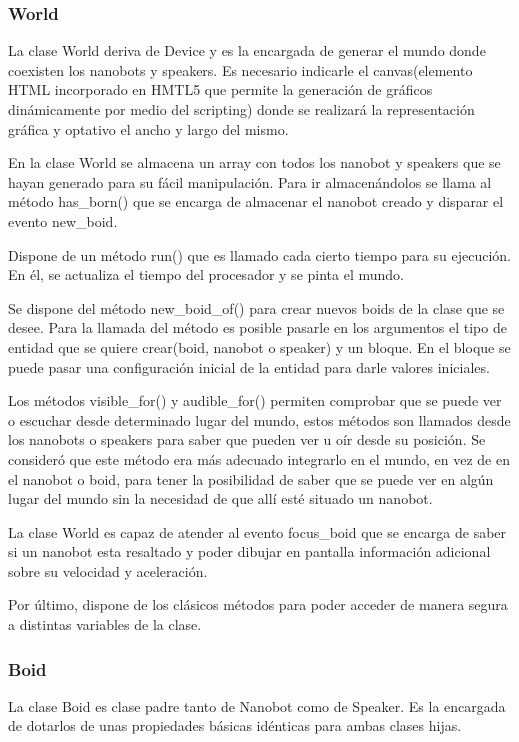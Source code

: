 \subsubsection{World}
\label{sec:world}
La clase World deriva de Device y es la encargada de generar el mundo donde coexisten los nanobots y speakers. Es necesario indicarle el canvas(elemento HTML incorporado en HMTL5 que permite la generación de gráficos dinámicamente por medio del scripting) donde se realizará la representación gráfica y optativo el ancho y largo del mismo. 

En la clase World se almacena un array con todos los nanobot y speakers que se hayan generado  para su fácil manipulación. Para ir almacenándolos se llama al método has\_born() que se encarga de almacenar el nanobot creado y disparar el evento new\_boid.

Dispone de un método run() que es llamado cada cierto tiempo para su ejecución. En él,  se actualiza el tiempo del procesador y se pinta el mundo.

Se dispone del método new\_boid\_of() para crear nuevos boids de la clase que se desee. Para la llamada del método es posible pasarle en los argumentos el tipo de entidad que se quiere crear(boid, nanobot o speaker) y un bloque. En el bloque se puede pasar una configuración inicial de la entidad para darle valores iniciales.

Los métodos visible\_for() y audible\_for() permiten comprobar que se puede ver o escuchar desde determinado lugar del mundo, estos métodos son llamados desde los nanobots o speakers para saber que pueden ver u oír desde su posición. Se consideró que este método era más adecuado integrarlo en el mundo, en vez de en el nanobot o boid, para tener la posibilidad de saber que se puede ver en algún lugar del mundo sin la necesidad de que allí esté situado un nanobot.

La clase World es capaz de atender al evento focus\_boid que se encarga de saber si un nanobot esta resaltado y poder dibujar en pantalla información adicional sobre su velocidad y aceleración.

Por último, dispone de los clásicos métodos para poder acceder de manera segura a distintas variables de la clase.

\subsubsection{Boid}
\label{sec:boid}
La clase Boid es clase padre tanto de Nanobot como de Speaker. Es la encargada de dotarlos de unas propiedades básicas idénticas para ambas clases hijas.
 
